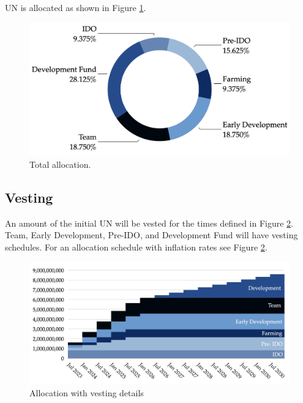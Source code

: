 \documentclass[12pt]{article}
\begin{document}
UN is allocated as shown in Figure \ref{fig:allocation}. 

\begin{figure}[h!]
\centering
  \includegraphics[width=5in]{images/UN_Allocation.png}
  \caption{Total allocation.}
  \label{fig:allocation}
\end{figure}



\subsection{Vesting}

An amount of the initial UN will be vested for the times defined in Figure \ref{fig:allocation_timeline}. Team, Early Development, Pre-IDO, and Development Fund will have vesting schedules. For an allocation schedule with inflation rates see Figure \ref{fig:allocation_timeline}.


\begin{figure}[H]
\centering
  \includegraphics[width=5in]{images/UN_Allocation_Timeline.png}
  \caption{Allocation with vesting details}
  \label{fig:allocation_timeline}
\end{figure}
\end{document}
